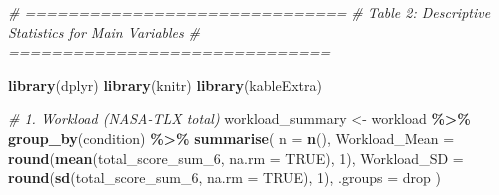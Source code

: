 \documentclass[
]{article}
\newenvironment{Shaded}{\begin{snugshade}}{\end{snugshade}}
\newcommand{\AttributeTok}[1]{\textcolor[rgb]{0.13,0.29,0.53}{#1}}
\newcommand{\CommentTok}[1]{\textcolor[rgb]{0.56,0.35,0.01}{\textit{#1}}}
\newcommand{\ConstantTok}[1]{\textcolor[rgb]{0.56,0.35,0.01}{#1}}
\newcommand{\DecValTok}[1]{\textcolor[rgb]{0.00,0.00,0.81}{#1}}
\newcommand{\FunctionTok}[1]{\textcolor[rgb]{0.13,0.29,0.53}{\textbf{#1}}}
\newcommand{\NormalTok}[1]{#1}
\newcommand{\OtherTok}[1]{\textcolor[rgb]{0.56,0.35,0.01}{#1}}
\newcommand{\SpecialCharTok}[1]{\textcolor[rgb]{0.81,0.36,0.00}{\textbf{#1}}}
\newcommand{\StringTok}[1]{\textcolor[rgb]{0.31,0.60,0.02}{#1}}
\begin{document}
\begin{Shaded}
\begin{Highlighting}[]
\CommentTok{\# ==============================}
\CommentTok{\# Table 2: Descriptive Statistics for Main Variables}
\CommentTok{\# ==============================}

\FunctionTok{library}\NormalTok{(dplyr)}
\FunctionTok{library}\NormalTok{(knitr)}
\FunctionTok{library}\NormalTok{(kableExtra)}

\CommentTok{\# 1. Workload (NASA{-}TLX total)}
\NormalTok{workload\_summary }\OtherTok{\textless{}{-}}\NormalTok{ workload }\SpecialCharTok{\%\textgreater{}\%}
  \FunctionTok{group\_by}\NormalTok{(condition) }\SpecialCharTok{\%\textgreater{}\%}
  \FunctionTok{summarise}\NormalTok{(}
    \AttributeTok{n =} \FunctionTok{n}\NormalTok{(),}
    \AttributeTok{Workload\_Mean =} \FunctionTok{round}\NormalTok{(}\FunctionTok{mean}\NormalTok{(total\_score\_sum\_6, }\AttributeTok{na.rm =} \ConstantTok{TRUE}\NormalTok{), }\DecValTok{1}\NormalTok{),}
    \AttributeTok{Workload\_SD   =} \FunctionTok{round}\NormalTok{(}\FunctionTok{sd}\NormalTok{(total\_score\_sum\_6, }\AttributeTok{na.rm =} \ConstantTok{TRUE}\NormalTok{), }\DecValTok{1}\NormalTok{),}
    \AttributeTok{.groups =} \StringTok{\textquotesingle{}drop\textquotesingle{}}
\NormalTok{  )}


\end{Highlighting}
\end{Shaded}
\end{document}
